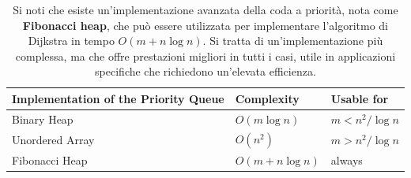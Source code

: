 \begin{table}[h]
    \centering
    \renewcommand{\arraystretch}{1} 
    
    \begin{tabularx}{\textwidth}{| l | X | X |}
        \hline
        \textbf{Implementation of the Priority Queue} & \textbf{Complexity} & \textbf{Usable for} \\
        \hline
        
        Binary Heap     & $O(m \log n)$     & $m < n^2 / \log n$ \\
        \hline
        
        Unordered Array & $O(n^2)$          & $m > n^2 / \log n$ \\
        \hline
        
        Fibonacci Heap  & $O(m + n \log n)$ & always \\
        \hline
    \end{tabularx}
    \caption{Si noti che esiste un'implementazione avanzata della coda a priorità, nota come \textbf{Fibonacci heap}, che può essere utilizzata per implementare l'algoritmo di Dijkstra in tempo $O(m + n \log n)$. Si tratta di un'implementazione più complessa, ma che offre prestazioni migliori in tutti i casi, utile in applicazioni specifiche che richiedono un'elevata efficienza.}
    \label{tab:dijkstra_implementations_comparison}
\end{table}


\clearpage
